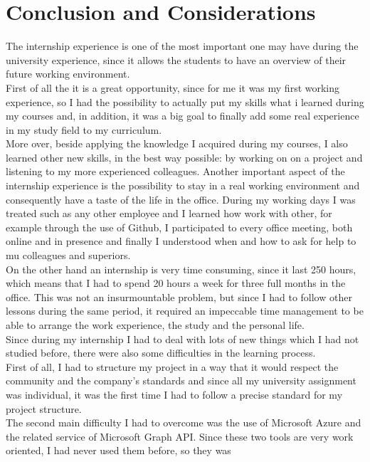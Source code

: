 \documentclass[12pt, a4paper, oneside]{article}
\begin{document}
\section{Conclusion and Considerations}
The internship experience is one of the most important one may have during the university experience, since it allows the students to have an overview of their future working environment.\\
First of all the it is a great opportunity, since for me it was my first working experience, so I had the possibility to actually put my skills what i learned during my courses and, in addition, it was a
big goal to finally add some real experience in my study field to my curriculum.\\
More over, beside applying the knowledge I acquired during my courses, I also learned other new skills, in the best way possible: by working on on a project and listening to my more experienced colleagues.
Another important aspect of the internship experience is the possibility to stay in a real working environment and consequently have a taste of the life in the office. During my working days I was treated such
as any other employee and I learned how work with other, for example through the use of Github, I participated to every office meeting, both online and in presence and finally I understood when and how to ask
for help to mu colleagues and superiors.\\
On the other hand an internship is very time consuming, since it last 250 hours, which means that I had to spend 20 hours a week for three full months in the office. This was not an insurmountable problem, but
since I had to follow other lessons during the same period, it required an impeccable time management to be able to arrange the work experience, the study and the personal life.\\ 
Since during my internship I had to deal with lots of new things which I had not studied before, there were also some difficulties in the learning process. \\
First of all, I had to structure my project in a way that it would respect the community and the company's standards and since all my university assignment was individual, it was the first time I had to follow a 
precise standard for my project structure.\\ 
The second main difficulty I had to overcome was the use of Microsoft Azure and the related service of Microsoft Graph API. Since these two tools are very work oriented, I had never used them before, so they was
\end{document}
